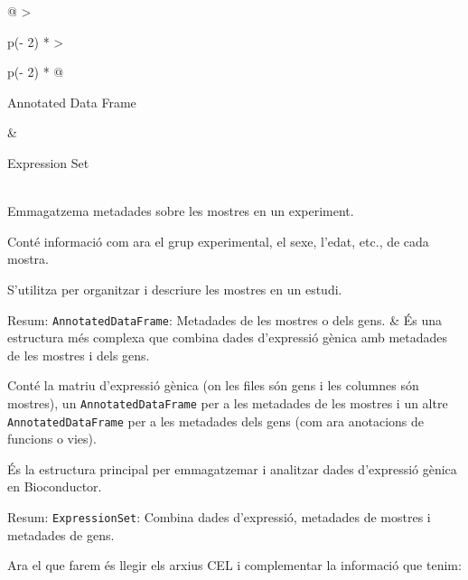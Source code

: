 \documentclass[
]{article}
\newenvironment{Shaded}{\begin{snugshade}}{\end{snugshade}}
\newcommand{\AttributeTok}[1]{\textcolor[rgb]{0.13,0.29,0.53}{#1}}
\newcommand{\CommentTok}[1]{\textcolor[rgb]{0.56,0.35,0.01}{\textit{#1}}}
\newcommand{\FunctionTok}[1]{\textcolor[rgb]{0.13,0.29,0.53}{\textbf{#1}}}
\newcommand{\NormalTok}[1]{#1}
\newcommand{\OtherTok}[1]{\textcolor[rgb]{0.56,0.35,0.01}{#1}}
\newcommand{\SpecialCharTok}[1]{\textcolor[rgb]{0.81,0.36,0.00}{\textbf{#1}}}
\begin{document}
\begin{longtable}[]{@{}
  >{\raggedright\arraybackslash}p{(\columnwidth - 2\tabcolsep) * }
  >{\raggedright\arraybackslash}p{(\columnwidth - 2\tabcolsep) * }@{}}
\toprule\noalign{}
\begin{minipage}[b]{\linewidth}\raggedright
Annotated Data Frame
\end{minipage} & \begin{minipage}[b]{\linewidth}\raggedright
Expression Set
\end{minipage} \\
\midrule\noalign{}
\endhead
\bottomrule\noalign{}
\endlastfoot
Emmagatzema metadades sobre les mostres en un experiment.

Conté informació com ara el grup experimental, el sexe, l'edat, etc., de
cada mostra.

S'utilitza per organitzar i descriure les mostres en un estudi.

Resum: \texttt{AnnotatedDataFrame}: Metadades de les mostres o dels
gens. & És una estructura més complexa que combina dades d'expressió
gènica amb metadades de les mostres i dels gens.

Conté la matriu d'expressió gènica (on les files són gens i les columnes
són mostres), un \texttt{AnnotatedDataFrame} per a les metadades de les
mostres i un altre \texttt{AnnotatedDataFrame} per a les metadades dels
gens (com ara anotacions de funcions o vies).

És la estructura principal per emmagatzemar i analitzar dades
d'expressió gènica en Bioconductor.

Resum: \texttt{ExpressionSet}: Combina dades d'expressió, metadades de
mostres i metadades de gens. \\
\end{longtable}

Ara el que farem és llegir els arxius CEL i complementar la informació
que tenim:

\begin{Shaded}
\end{Shaded}
\end{document}
